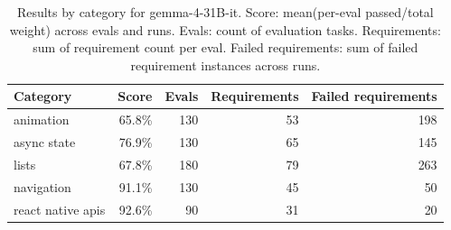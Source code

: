 \begin{table}[htbp]
\centering
\begin{tabular}{lrrrr}
\toprule
Category & Score & Evals & Requirements & Failed requirements \\
\midrule
animation & 65.8\% & 130 & 53 & 198 \\
async state & 76.9\% & 130 & 65 & 145 \\
lists & 67.8\% & 180 & 79 & 263 \\
navigation & 91.1\% & 130 & 45 & 50 \\
react native apis & 92.6\% & 90 & 31 & 20 \\
\bottomrule
\end{tabular}
\caption{Results by category for gemma-4-31B-it. Score: mean(per-eval passed/total weight) across evals and runs. Evals: count of evaluation tasks. Requirements: sum of requirement count per eval. Failed requirements: sum of failed requirement instances across runs.}
\end{table}
